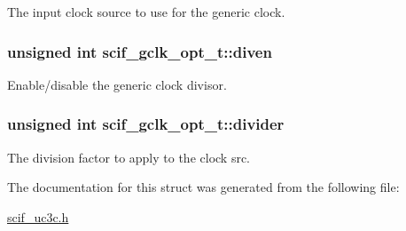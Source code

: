 \-The input clock source to use for the generic clock. 

\hypertarget{structscif__gclk__opt__t_a9f55e1a053f9b01014ba215e52e1f2d8}{
\subsubsection[{diven}]{\setlength{\rightskip}{0pt plus 5cm}unsigned int {\bf scif\-\_\-gclk\-\_\-opt\-\_\-t\-::diven}}}
\label{structscif__gclk__opt__t_a9f55e1a053f9b01014ba215e52e1f2d8}


\-Enable/disable the generic clock divisor. 

\hypertarget{structscif__gclk__opt__t_ab737b01b420ea1a5df2fb2de4efe6b3e}{
\subsubsection[{divider}]{\setlength{\rightskip}{0pt plus 5cm}unsigned int {\bf scif\-\_\-gclk\-\_\-opt\-\_\-t\-::divider}}}
\label{structscif__gclk__opt__t_ab737b01b420ea1a5df2fb2de4efe6b3e}


\-The division factor to apply to the clock src. 



\-The documentation for this struct was generated from the following file\-:\begin{DoxyCompactItemize}
\item 
\hyperlink{scif__uc3c_8h}{scif\-\_\-uc3c.\-h}\end{DoxyCompactItemize}
